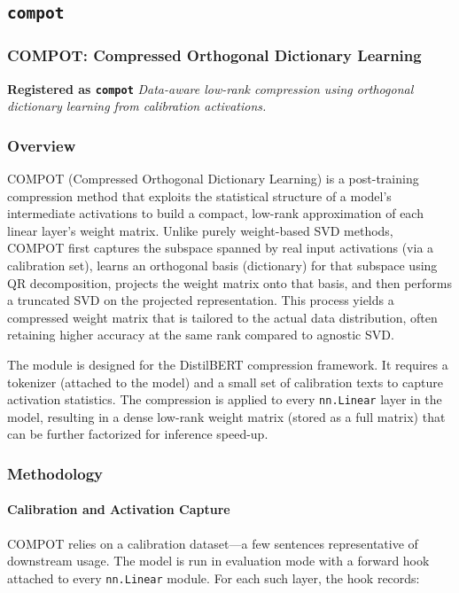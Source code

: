 \subsection{\texttt{compot}}
\subsubsection*{COMPOT: Compressed Orthogonal Dictionary Learning}

\textbf{Registered as \texttt{compot}}
\textit{Data-aware low-rank compression using orthogonal dictionary learning from calibration activations.}


\subsubsection*{Overview}

COMPOT (Compressed Orthogonal Dictionary Learning) is a post-training compression method that exploits the statistical structure of a model's intermediate activations to build a compact, low-rank approximation of each linear layer's weight matrix. Unlike purely weight-based SVD methods, COMPOT first captures the subspace spanned by real input activations (via a calibration set), learns an orthogonal basis (dictionary) for that subspace using QR decomposition, projects the weight matrix onto that basis, and then performs a truncated SVD on the projected representation. This process yields a compressed weight matrix that is tailored to the actual data distribution, often retaining higher accuracy at the same rank compared to agnostic SVD.

The module is designed for the DistilBERT compression framework. It requires a tokenizer (attached to the model) and a small set of calibration texts to capture activation statistics. The compression is applied to every \texttt{nn.Linear} layer in the model, resulting in a dense low-rank weight matrix (stored as a full matrix) that can be further factorized for inference speed-up.


\subsubsection*{Methodology}

\paragraph{Calibration and Activation Capture}

COMPOT relies on a calibration dataset---a few sentences representative of downstream usage. The model is run in evaluation mode with a forward hook attached to every \texttt{nn.Linear} module. For each such layer, the hook records:

